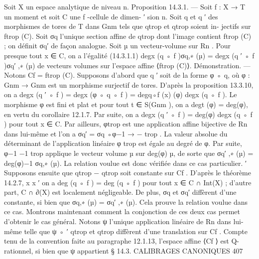 \documentclass[
  10pt,
]{article}
\newenvironment{Shaded}{}{}
\newcommand{\NormalTok}[1]{#1}
\begin{document}
\begin{Shaded}
\begin{Highlighting}[]
\NormalTok{  Soit X un espace analytique de niveau n.}
\NormalTok{Proposition 14.3.1. — Soit f : X → T un moment et soit C une f {-}cellule de dimen{-}}
\NormalTok{                                                                                 ′}
\NormalTok{sion n. Soit q et q ′ des morphismes de tores de T dans Gnm tels que qtrop et qtrop  soient in{-}}
\NormalTok{jectifs sur ftrop (C). Soit σq l’unique section affine de qtrop dont l’image contient ftrop (C) ;}
\NormalTok{on définit σq′ de façon analogue.}
\NormalTok{   Soit µ un vecteur{-}volume sur Rn . Pour presque tout x ∈ C, on a l’égalité}
\NormalTok{(14.3.1.1)                  degx (q ◦ f )σq,∗ (µ) = degx (q ′ ◦ f )σq′ ,∗ (µ)}
\NormalTok{de vecteurs volumes sur l’espace affine ⟨ftrop (C)⟩.}
\NormalTok{Démonstration. — Notons Cf = ftrop (C).}
\NormalTok{  Supposons d’abord que q ′ soit de la forme φ ◦ q, où φ : Gnm → Gnm est un morphisme}
\NormalTok{surjectif de tores. D’après la proposition 13.3.10, on a}
\NormalTok{                  degx (q ′ ◦ f ) = degx (φ ◦ q ◦ f ) = degq◦f (x) (φ) degx (q ◦ f ).}
\NormalTok{Le morphisme φ est fini et plat et pour tout t ∈ S(Gnm ), on a degt (φ) = deg(φ), en vertu}
\NormalTok{du corollaire 12.1.7. Par suite, on a degx (q ′ ◦ f ) = deg(φ) degx (q ◦ f ) pour tout x ∈ C.}
\NormalTok{   Par ailleurs, φtrop est une application affine bijective de Rn dans lui{-}même et l’on a}
\NormalTok{σq′ = σq ◦φ−1                                                                    →}
\NormalTok{                                                                                 −}
\NormalTok{              trop . La valeur absolue du déterminant de l’application linéaire φ trop est égale}
\NormalTok{au degré de φ. Par suite, φ−1                                                 −1}
\NormalTok{                                trop applique le vecteur volume µ sur deg(φ) µ, de sorte que}
\NormalTok{σq′ ,∗ (µ) = deg(φ)−1 σq,∗ (µ). La relation voulue est donc vérifiée dans ce cas particulier.}
\NormalTok{                               ′}
\NormalTok{   Supposons ensuite que qtrop    − qtrop soit constante sur Cf . D’après le théorème 14.2.7,}
\NormalTok{          x                 x ′}
\NormalTok{on a deg (q ◦ f ) = deg (q ◦ f ) pour tout x ∈ C ∩ Int(X) ; d’autre part, C ∩ ∂(X)}
\NormalTok{est localement négligeable. De plus, σq et σq′ diffèrent d’une constante, si bien que}
\NormalTok{σq,∗ (µ) = σq′ ,∗ (µ). Cela prouve la relation voulue dans ce cas.}
\NormalTok{   Montrons maintenant comment la conjonction de ces deux cas permet d’obtenir le}
\NormalTok{cas général. Notons ψ l’unique application linéaire de Rn dans lui{-}même telle que ψ ◦}
\NormalTok{          ′}
\NormalTok{qtrop et qtrop diffèrent d’une translation sur Cf . Compte tenu de la convention faite}
\NormalTok{au paragraphe 12.1.13, l’espace affine ⟨Cf ⟩ est Q{-}rationnel, si bien que ψ appartient}
\NormalTok{                                 § 14.3. CALIBRAGES CANONIQUES                                  407}


\end{Highlighting}
\end{Shaded}
\end{document}
